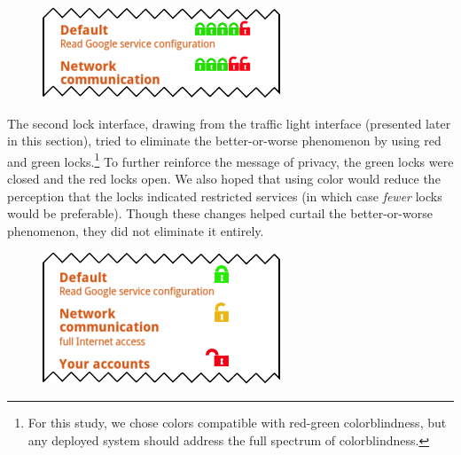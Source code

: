 \documentclass[11pt]{article}
\newcommand{\refsec}[1]{Section~\ref{#1}}
\begin{document}
\begin{figure}
\begin{center}
\includegraphics[width=.9\linewidth]{candidate-img/locks/locksR2.png}
\end{center}
\end{figure}

The second lock interface, drawing from the traffic light interface
(presented later in this section), tried to eliminate the better-or-worse 
phenomenon by using red and green locks.\footnote{For this 
  study, we chose colors
  compatible with red-green colorblindness, but any deployed system
  should address the full spectrum of colorblindness.}
\label{ss-sec-locks-r2}
To further reinforce the message of privacy, the 
green locks were closed and the red locks open.
We also hoped that using color would reduce 
the perception that the locks indicated restricted services (in which 
case \emph{fewer} locks would be preferable).
Though these changes helped curtail the better-or-worse phenomenon, they did not 
eliminate it entirely. 


\begin{figure}
\begin{center}
\includegraphics[width=.9\linewidth]{candidate-img/locks/locksR3.png}
\end{center}
\end{figure}
\end{document}
